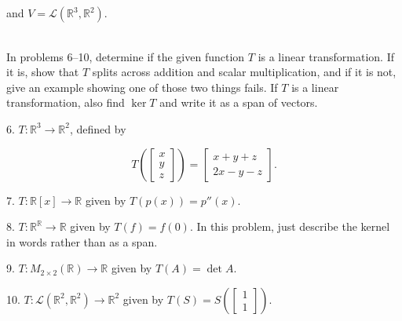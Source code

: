 \documentclass{article}
\begin{document}
and $V = \mathcal{L}(\mathbb{R}^3, \mathbb{R}^2)$.

~\\

In problems 6--10, determine if the given function $T$ is a linear transformation. If it is, show that $T$ splits across addition and scalar multiplication, and if it is not, give an example showing one of those two things fails. If $T$ is a linear transformation, also find $\ker T$ and write it as a span of vectors.

6. $T : \mathbb{R}^3 \to \mathbb{R}^2$, defined by

$$
	T \left( \left[\begin{array}{c} x \\ y \\ z \end{array}\right] \right) = \left[\begin{array}{c} x + y + z \\ 2x - y - z \end{array}\right].
$$

7. $T : \mathbb{R}[x] \to \mathbb{R}$ given by $T(p(x)) = p''(x)$.

8. $T : \mathbb{R}^\mathbb{R} \to \mathbb{R}$ given by $T(f) = f(0)$. In this problem, just describe the kernel in words rather than as a span.

9. $T : M_{2 \times 2}(\mathbb{R}) \to \mathbb{R}$ given by $T(A) = \det A$.

10. $T : \mathcal{L}(\mathbb{R}^2, \mathbb{R}^2) \to \mathbb{R}^2$ given by $T(S) = S\left( \left[\begin{array}{c} 1 \\ 1 \end{array}\right] \right)$.
\end{document}
